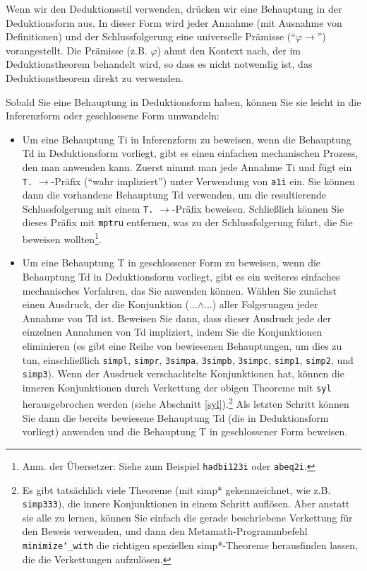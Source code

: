Wenn wir den Deduktionsstil verwenden, drücken wir eine Behauptung in der Deduktionsform aus. In dieser Form wird jeder Annahme (mit Ausnahme von Definitionen) und der Schlussfolgerung eine universelle Prämisse ("`$\varphi \rightarrow$"') vorangestellt. Die Prämisse (z.B. $\varphi$) ahmt den Kontext nach, der im Deduktionstheorem behandelt wird, so dass es nicht notwendig ist, das Deduktionstheorem direkt zu verwenden.

Sobald Sie eine Behauptung in Deduktionsform haben, können Sie sie leicht in die Inferenzform oder geschlossene Form umwandeln:

\begin{itemize}
\item Um eine Behauptung Ti in Inferenzform zu beweisen, wenn die Behauptung Td in Deduktionsform vorliegt, gibt es einen einfachen mechanischen Prozess, den man anwenden kann. Zuerst nimmt man jede Annahme Ti und fügt ein \texttt{T.} $\rightarrow$-Präfix ("`wahr impliziert"') unter Verwendung von \texttt{a1i} ein. Sie können dann die vorhandene Behauptung Td verwenden, um die resultierende Schlussfolgerung mit einem \texttt{T.} $\rightarrow$-Präfix beweisen. Schließlich können Sie dieses Präfix mit \texttt{mptru} entfernen, was zu der Schlussfolgerung führt, die Sie beweisen wollten\footnote{Anm. der Übersetzer: Siehe zum Beispiel \texttt{hadbi123i} oder \texttt{abeq2i}.}. 
\item Um eine Behauptung T in geschlossener Form zu beweisen, wenn die Behauptung Td in Deduktionsform vorliegt, gibt es ein weiteres einfaches mechanisches Verfahren, das Sie anwenden können. Wählen Sie zunächst einen Ausdruck, der die Konjunktion (...$\land$...) aller Folgerungen jeder Annahme von Td ist. Beweisen Sie dann, dass dieser Ausdruck jede der einzelnen Annahmen von Td impliziert, indem Sie die Konjunktionen eliminieren (es gibt eine Reihe von bewiesenen Behauptungen, um dies zu tun, einschließlich
\texttt{simpl},
\texttt{simpr},
\texttt{3simpa},
\texttt{3simpb},
\texttt{3simpc},
\texttt{simp1},
\texttt{simp2},
und
\texttt{simp3}).
Wenn der Ausdruck verschachtelte Konjunktionen hat, können die inneren Konjunktionen durch Verkettung der obigen Theoreme mit \texttt{syl} herausgebrochen werden (siehe Abschnitt \ref{syl}).\footnote{Es gibt tatsächlich viele Theoreme (mit simp* gekennzeichnet, wie z.B. \texttt{simp333}), die innere Konjunktionen in einem Schritt auflösen. Aber anstatt sie alle zu lernen, können Sie einfach die gerade beschriebene Verkettung für den Beweis verwenden, und dann den Metamath-Programmbefehl \texttt{minimize{\char`\_}with} die richtigen speziellen simp*-Theoreme herausfinden lassen, die die Verkettungen aufzulösen.} Als letzten Schritt können Sie dann die bereits bewiesene Behauptung Td (die in Deduktionsform vorliegt) anwenden und die Behauptung T in geschlossener Form beweisen.
\end{itemize}

